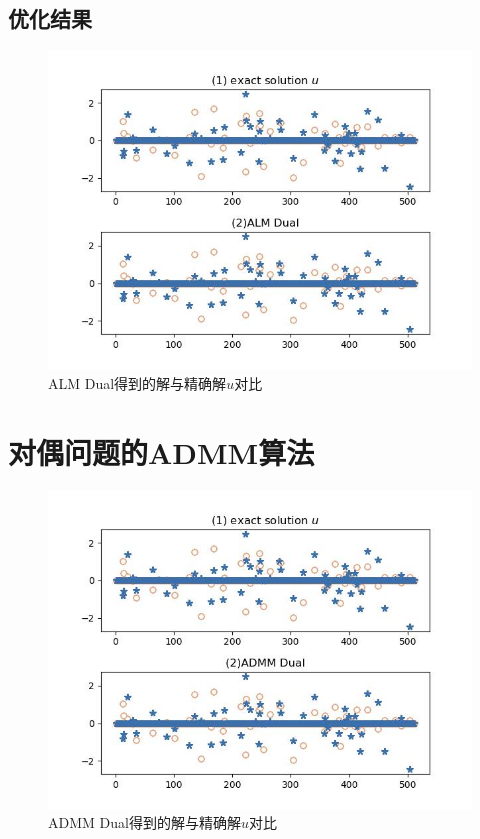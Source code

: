 \documentclass[12pt]{article}
\begin{document}
 \subsection{优化结果}
  	\begin{figure}[H]
 	\centering
 	\includegraphics[width=\textwidth]{figs/ALM Dual.jpg}
 	\caption{ALM Dual得到的解与精确解$u$对比}
 \end{figure}
 
 
 
  \section{对偶问题的ADMM算法}
    	\begin{figure}[H]
  	\centering
  	\includegraphics[width=\textwidth]{figs/ADMM Dual.jpg}
  	\caption{ADMM Dual得到的解与精确解$u$对比}
  \end{figure}
  
\end{document}

